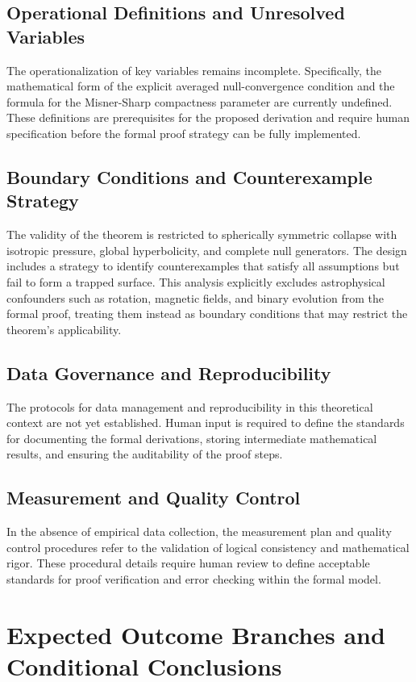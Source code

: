 \documentclass[conference]{IEEEtran}
\begin{document}
\subsection{Operational Definitions and Unresolved Variables}
The operationalization of key variables remains incomplete. Specifically, the mathematical form of the explicit averaged null-convergence condition and the formula for the Misner-Sharp compactness parameter are currently undefined. These definitions are prerequisites for the proposed derivation and require human specification before the formal proof strategy can be fully implemented.

\subsection{Boundary Conditions and Counterexample Strategy}
The validity of the theorem is restricted to spherically symmetric collapse with isotropic pressure, global hyperbolicity, and complete null generators. The design includes a strategy to identify counterexamples that satisfy all assumptions but fail to form a trapped surface. This analysis explicitly excludes astrophysical confounders such as rotation, magnetic fields, and binary evolution from the formal proof, treating them instead as boundary conditions that may restrict the theorem's applicability.

\subsection{Data Governance and Reproducibility}
The protocols for data management and reproducibility in this theoretical context are not yet established. Human input is required to define the standards for documenting the formal derivations, storing intermediate mathematical results, and ensuring the auditability of the proof steps.

\subsection{Measurement and Quality Control}
In the absence of empirical data collection, the measurement plan and quality control procedures refer to the validation of logical consistency and mathematical rigor. These procedural details require human review to define acceptable standards for proof verification and error checking within the formal model.

\section{Expected Outcome Branches and Conditional Conclusions}
\end{document}
